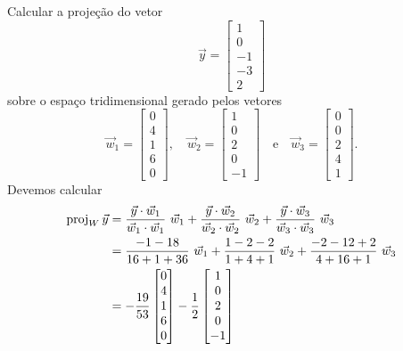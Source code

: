 \documentclass[../livro.tex]{subfiles}  %
\begin{document}
\begin{example}
Calcular a projeção do vetor
\begin{equation}
\vec{y} =
\begin{bmatrix}
1 \\ 0 \\ -1 \\ -3 \\ 2
\end{bmatrix}
\end{equation} sobre o espaço tridimensional gerado pelos vetores
\begin{equation}
\vec{w}_1 =
\begin{bmatrix}
 0\\4\\1 \\ 6 \\0
\end{bmatrix}, \quad
\vec{w}_2 =
\begin{bmatrix}
 1\\0\\2\\0\\-1
\end{bmatrix} \quad \text{e} \quad
\vec{w}_3 =
\begin{bmatrix}
 0\\0\\2\\4\\ 1
\end{bmatrix}.
\end{equation} Devemos calcular
\begin{equation}
\begin{split}
\operatorname{proj}_W \vec{y} & = \frac{\vec{y} \cdot \vec{w}_1}{\vec{w}_1 \cdot \vec{w}_1} \ \vec{w}_1 + \frac{\vec{y} \cdot \vec{w}_2}{\vec{w}_2 \cdot \vec{w}_2} \ \vec{w}_2 + \frac{\vec{y} \cdot \vec{w}_3}{\vec{w}_3 \cdot \vec{w}_3} \ \vec{w}_3\\
                & = \frac{ - 1 -18 }{ 16 + 1 + 36 } \ \vec{w}_1 + \frac{ 1 - 2 - 2 }{ 1 + 4 + 1 } \ \vec{w}_2 + \frac{ -2-12+2 }{ 4 + 16 + 1 } \ \vec{w}_3 \\
                & = -\frac{19}{53} \begin{bmatrix}
 0\\4\\1 \\ 6 \\0
\end{bmatrix} - \frac{1}{2} \begin{bmatrix}
 1\\0\\2\\0\\-1

\end{bmatrix}
\end{split}
\end{equation}
\end{example}
\end{document}
